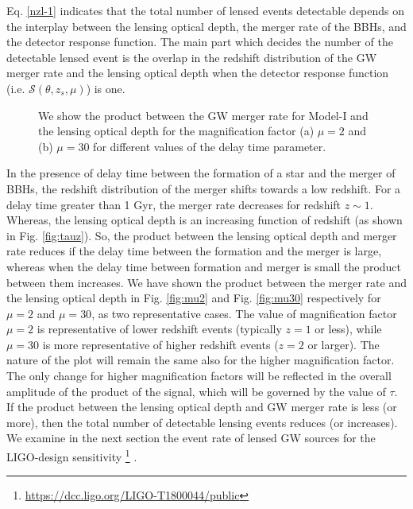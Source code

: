\documentclass[a4paper,useAMS,usenatbib]{mnras}
\begin{document}
Eq. \eqref{nzl-1} indicates that the total number of lensed events detectable depends on the interplay between the lensing optical depth, the merger rate of the BBHs, and the detector response function. The main part which decides the number of the detectable lensed event is the overlap in the redshift distribution of the GW merger rate and the lensing optical depth when the detector response function (i.e. $\mathcal{S}(\theta, z_s, \mu)$) is one.  

\begin{figure*}
\centering
{}

\captionsetup{singlelinecheck=on,justification=raggedright}
\caption{We show the product between the GW merger rate for Model-I and the lensing optical depth for the magnification factor (a) $\mu=2$ and (b) $\mu=30$ for different values of the delay time parameter.}
\label{fig:m2}
\end{figure*}

In the presence of delay time between the formation of a star and the merger of BBHs, the redshift distribution of the merger shifts towards a low redshift. For a delay time greater than 1 Gyr, the merger rate decreases for redshift $z\sim 1$. Whereas, the lensing optical depth is an increasing function of redshift (as shown in Fig. \ref{fig:tauz}).  {So, the product between the lensing optical depth and merger rate reduces if the delay time between the formation and the merger is large, whereas when the delay time between formation and merger is small the product between them increases. We have shown the product between the merger rate and the lensing optical depth in Fig. \ref{fig:mu2} and Fig. \ref{fig:mu30} respectively for $\mu=2$ and $\mu=30$, as two representative cases. The value of magnification factor $\mu=2$ is representative of lower redshift events (typically $z=1$ or less), while $\mu=30$ is more representative of higher redshift events ($z=2$ or larger). The nature of the plot will remain the same also for the higher magnification factor. The only change for higher magnification factors will be reflected in the overall amplitude of the product of the signal, which will be governed by the value of $\tau$.  If the product between the lensing optical depth and GW merger rate is less (or more), then the total number of detectable lensing events reduces (or increases).} We examine in the next section the event rate of lensed GW sources for the LIGO-design sensitivity \footnote{ \href{https://dcc.ligo.org/LIGO-T1800044/public}{https://dcc.ligo.org/LIGO-T1800044/public}} \citep{Aasi:2013wya, TheLIGOScientific:2014jea,TheVirgo:2014hva}. 
\end{document}
